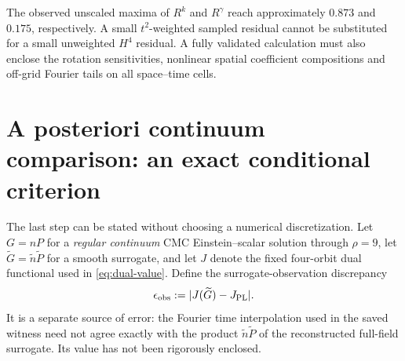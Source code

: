 \documentclass[11pt,a4paper]{article}
\theoremstyle{remark}
\begin{document}
The observed unscaled maxima of $R^k$ and $R^\gamma$ reach approximately $0.873$ and $0.175$, respectively. A small $t^2$-weighted sampled residual cannot be substituted for a small unweighted $H^4$ residual. A fully validated calculation must also enclose the rotation sensitivities, nonlinear spatial coefficient compositions and off-grid Fourier tails on all space--time cells.

\section{A posteriori continuum comparison: an exact conditional criterion}
\label{sec:continuum-comparison}
The last step can be stated without choosing a numerical discretization. Let $G=nP$ for a \emph{regular continuum} CMC Einstein--scalar solution through $\rho=9$, let $\widetilde G=\widetilde n\widetilde P$ for a smooth surrogate, and let $J$ denote the fixed four-orbit dual functional used in \eqref{eq:dual-value}. Define the surrogate-observation discrepancy
\[
\epsilon_{\rm obs}:=|J(\widetilde G)-J_{\rm PL}|.
\]
It is a separate source of error: the Fourier time interpolation used in the saved witness need not agree exactly with the product $\widetilde n\widetilde P$ of the reconstructed full-field surrogate. Its value has not been rigorously enclosed.
\end{document}
